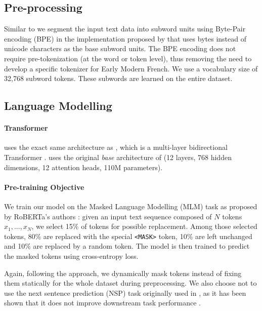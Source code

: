 \subsection{Pre-processing}
Similar to \roberta \citep{liu-etal-2019-roberta} we segment the input text data into subword units using Byte-Pair encoding (BPE) \citep{sennrich-etal-2016-neural} in the implementation proposed by \citep{radford-etal-2019-language} that uses bytes instead of unicode characters as the base subword units. The BPE encoding does not require pre-tokenization (at the word or token level), thus removing the need to develop a specific tokenizer for Early Modern French. We use a vocabulary size of 32,768 subword tokens. These subwords are learned on the entire \freemmax dataset.

\subsection{Language Modelling}

\paragraph{Transformer}
\dalembert uses the exact same architecture as \roberta, which is a multi-layer bidirectional Transformer \citep{vaswani-etal-2017-attention}. \dalembert uses the original \emph{base} architecture of \roberta (12 layers, 768 hidden dimensions, 12 attention heads, 110M parameters).

\paragraph{Pre-training Objective}
We train our model on the Masked Language Modelling (MLM) task as proposed by RoBERTa's authors \citep{liu-etal-2019-roberta}: given an input text sequence composed of $N$ tokens $x_1, ..., x_N$, we select 15\% of tokens for possible replacement. Among those selected tokens, 80\% are replaced with the special \texttt{<MASK>} token, 10\% are left unchanged and 10\% are replaced by a random token. The model is then trained to predict the masked tokens using cross-entropy loss.

Again, following the \roberta approach, we dynamically mask tokens instead of fixing them statically for the whole dataset during preprocessing. We also choose not to use the next sentence prediction (NSP) task originally used in \bert \citep{devlin-etal-2019-bert}, as it has been shown that it does not improve downstream task performance \citep{conneau-lample-2019-cross,liu-etal-2019-roberta}.

